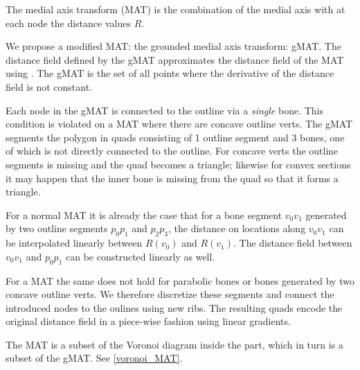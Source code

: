 The medial axis transform (MAT) is the combination of the medial axis with at each node the distance values $R$.

We propose a modified MAT: the grounded medial axis transform: gMAT.
The distance field defined by the gMAT approximates the distance field of the MAT using .
The gMAT is the set of all points where the derivative of the distance field is not constant.


Each node in the gMAT is connected to the outline via a \emph{single} bone.
This condition is violated on a MAT where there are concave outline verts.
The gMAT segments the polygon in quads consisting of 1 outline segment and 3 bones, one of which is not directly connected to the outline.
For concave verts the outline segments is missing and the quad becomes a triangle;
likewise for convex sections it may happen that the inner bone is missing from the quad so that it forms a triangle.

For a normal MAT it is already the case that
for a bone segment $v_0 v_1$ generated by two outline segments $p_0 p_1$ and $p_2 p_3$,
the distance on locations along $v_0 v_1$ can be interpolated linearly between $R(v_0)$ and $R(v_1)$.
The distance field between $v_0 v_1$ and $p_0 p_1$ can be constructed linearly as well.

For a MAT the same does not hold for parabolic bones or bones generated by two concave outline verts.
We therefore discretize these segments and connect the introduced nodes to the oulines using new ribs.
The resulting quads encode the original distance field in a piece-wise fashion using linear gradients.


The MAT is a subset of the Voronoi diagram inside the part, which in turn is a subset of the gMAT.
See \cref{voronoi_MAT}.

